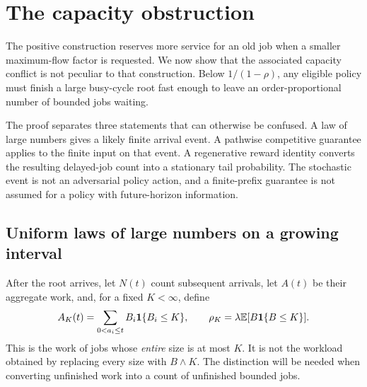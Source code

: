 \section{The capacity obstruction}\label{sec:obstruction}
The positive construction reserves more service for an old job when a smaller maximum-flow factor is requested. We now show that the associated capacity conflict is not peculiar to that construction. Below $1/(1-\rho)$, any eligible policy must finish a large busy-cycle root fast enough to leave an order-proportional number of bounded jobs waiting.

The proof separates three statements that can otherwise be confused. A law of large numbers gives a likely finite arrival event. A pathwise competitive guarantee applies to the finite input on that event. A regenerative reward identity converts the resulting delayed-job count into a stationary tail probability. The stochastic event is not an adversarial policy action, and a finite-prefix guarantee is not assumed for a policy with future-horizon information.

\subsection{Uniform laws of large numbers on a growing interval}
After the root arrives, let $N(t)$ count subsequent arrivals, let $A(t)$ be their aggregate work, and, for a fixed $K<\infty$, define
\begin{equation}\label{eq:bounded-work}
 A_K(t)=\sum_{0<a_i\leq t}B_i\mathbf 1\{B_i\leq K\},
 \qquad
 \rho_K=\lambda\mathbb E[B\mathbf 1\{B\leq K\}].
\end{equation}
This is the work of jobs whose \emph{entire} size is at most $K$. It is not the workload obtained by replacing every size with $B\wedge K$. The distinction will be needed when converting unfinished work into a count of unfinished bounded jobs.

